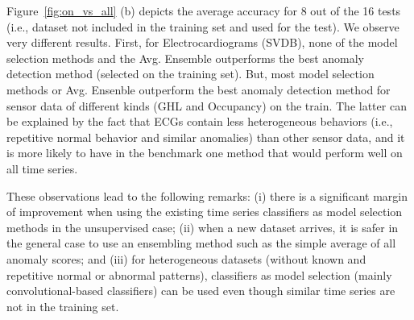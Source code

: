 Figure~\ref{fig:on_vs_all} (b) depicts the average accuracy for 8 out of the 16 tests (i.e., dataset not included in the training set and used for the test). We observe very different results. First, for Electrocardiograms (SVDB), none of the model selection methods and the Avg. Ensemble outperforms the best anomaly detection method (selected on the training set). But, most model selection methods or Avg. Ensenble outperform the best anomaly detection method for sensor data of different kinds (GHL and Occupancy) on the train. The latter can be explained by the fact that ECGs contain less heterogeneous behaviors (i.e., repetitive normal behavior and similar anomalies) than other sensor data, and it is more likely to have in the benchmark one method that would perform well on all time series. %

These observations lead to the following remarks: (i) there is a significant margin of improvement when using the existing time series classifiers as model selection methods in the unsupervised case; (ii) when a new dataset arrives, it is safer in the general case to use an ensembling method such as the simple average of all anomaly scores; and (iii) for heterogeneous datasets (without known and repetitive normal or abnormal patterns), classifiers as model selection (mainly convolutional-based classifiers) can be used even though similar time series are not in the training set.